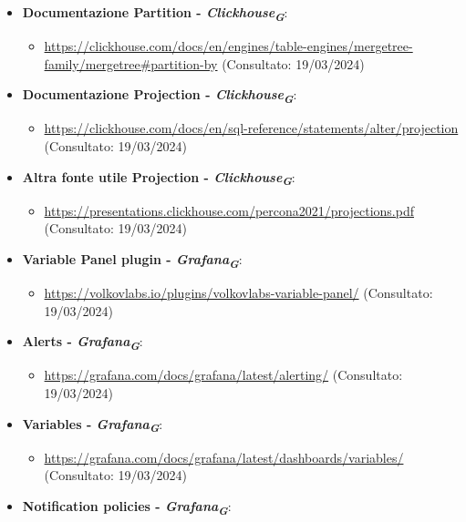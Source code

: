 \begin{itemize}
\begin{itemize}
    \end{itemize}
    \item \textbf{Documentazione Partition - \textit{Clickhouse}\textsubscript{\textit{G}}}: 
    \begin{itemize}
        \item \url{https://clickhouse.com/docs/en/engines/table-engines/mergetree-family/mergetree#partition-by} (Consultato: 19/03/2024)
    \end{itemize}
    \item \textbf{Documentazione Projection - \textit{Clickhouse}\textsubscript{\textit{G}}}: 
    \begin{itemize}
        \item \url{https://clickhouse.com/docs/en/sql-reference/statements/alter/projection} (Consultato: 19/03/2024)
    \end{itemize}
    \item \textbf{Altra fonte utile Projection - \textit{Clickhouse}\textsubscript{\textit{G}}}:
    \begin{itemize}
        \item \url{https://presentations.clickhouse.com/percona2021/projections.pdf} (Consultato: 19/03/2024)
    \end{itemize}
    \item \textbf{Variable Panel plugin - \textit{Grafana}\textsubscript{\textit{G}}}: 
    \begin{itemize}
        \item \url{https://volkovlabs.io/plugins/volkovlabs-variable-panel/} (Consultato: 19/03/2024)
    \end{itemize}
    \item \textbf{Alerts - \textit{Grafana}\textsubscript{\textit{G}}}: 
    \begin{itemize}
        \item \url{https://grafana.com/docs/grafana/latest/alerting/} (Consultato: 19/03/2024)
    \end{itemize}
    \item \textbf{Variables - \textit{Grafana}\textsubscript{\textit{G}}}: 
    \begin{itemize}
        \item \url{https://grafana.com/docs/grafana/latest/dashboards/variables/} (Consultato: 19/03/2024)
    \end{itemize}
    \item  \textbf{Notification policies - \textit{Grafana}\textsubscript{\textit{G}}}:
    \begin{itemize}

\end{itemize}
\end{itemize}
